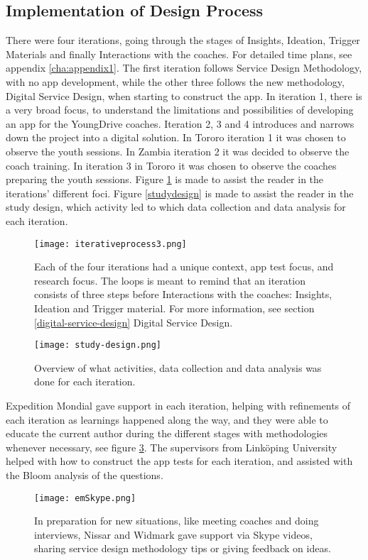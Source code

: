 \subsection{Implementation of Design Process}
There were four iterations, going through the stages of Insights, Ideation, Trigger Materials and finally Interactions with the coaches. For detailed time plans, see appendix \ref{cha:appendix1}. The first iteration follows Service Design Methodology, with no app development, while the other three follows the new methodology, Digital Service Design, when starting to construct the app. In iteration 1, there is a very broad focus, to understand the limitations and possibilities of developing an app for the YoungDrive coaches. Iteration 2, 3 and 4 introduces and narrows down the project into a digital solution. In Tororo iteration 1 it was chosen to observe the youth sessions. In Zambia iteration 2 it was decided to observe the coach training. In iteration 3 in Tororo it was chosen to observe the coaches preparing the youth sessions. Figure \ref{fig:methods} is made to assist the reader in the iterations' different foci. Figure \ref{studydesign} is made to assist the reader in the study design, which activity led to which data collection and data analysis for each iteration.

\begin{figure}[h]
    \centering
    \texttt{[image: iterativeprocess3.png]}
    \caption{Each of the four iterations had a unique context, app test focus, and research focus. The loops is meant to remind that an iteration consists of three steps before Interactions with the coaches: Insights, Ideation and Trigger material. For more information, see section \ref{digital-service-design} Digital Service Design.}
    \label{fig:methods}
\end{figure}

\begin{figure}[h]
    \centering
    \texttt{[image: study-design.png]}
    \caption{Overview of what activities, data collection and data analysis was done for each iteration.}
    \label{fig:studydesign}
\end{figure}

Expedition Mondial gave support in each iteration, helping with refinements of each iteration as learnings happened along the way, and they were able to educate the current author during the different stages with methodologies whenever necessary, see figure \ref{fig:emSkype}. The supervisors  from Linköping University helped with how to construct the app tests for each iteration, and assisted with the Bloom analysis of the questions.

\begin{figure}[h]
    \centering
    \texttt{[image: emSkype.png]}
    \caption{In preparation for new situations, like meeting coaches and doing interviews, Nissar and Widmark gave support via Skype videos, sharing service design methodology tips or giving feedback on ideas.}
    \label{fig:emSkype}
\end{figure}
